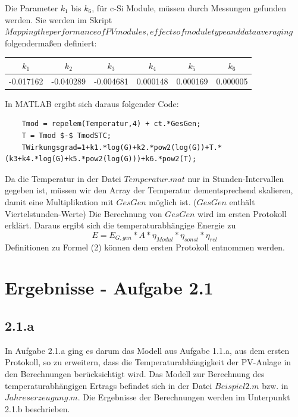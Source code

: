 \documentclass[a4paper,12pt]{article}
\begin{document}
	Die Parameter $k_1$ bis $k_6$, für c-Si Module, müssen durch Messungen gefunden werden. Sie werden im Skript $Mapping the performance of PV modules, effects of module type and data averaging$ folgendermaßen definiert:
	\begin{table}[H]
		\begin{tabular}{|l|c|c|c|c|c|}
			\hline
			\multicolumn{1}{|c|}{$k_1$} & $k_2$     & $k_3$     & $k_4$    & $k_5$    & $k_6$    \\ \hline
			-0.017162                   & -0.040289 & -0.004681 & 0.000148 & 0.000169 & 0.000005 \\ \hline
		\end{tabular}
	\end{table}
	In MATLAB ergibt sich daraus folgender Code:
	\begin{lstlisting}
	Tmod = repelem(Temperatur,4) + ct.*GesGen;
	T = Tmod $-$ TmodSTC;
	TWirkungsgrad=1+k1.*log(G)+k2.*pow2(log(G))+T.*(k3+k4.*log(G)+k5.*pow2(log(G)))+k6.*pow2(T);
	\end{lstlisting}
	Da die Temperatur in der Datei $Temperatur.mat$ nur in Stunden-Intervallen gegeben ist, müssen wir den Array der Temperatur dementsprechend skalieren, damit eine Multiplikation mit $GesGen$ möglich ist. ($GesGen$ enthält Viertelstunden-Werte)\newline
	Die Berechnung von $GesGen$ wird im ersten Protokoll erklärt.\newline
	Daraus ergibt sich die temperaturabhängige Energie zu
	\begin{equation}
	E=E_{G,gen}*A*\eta_{Modul}*\eta_{sonst}*\eta_{rel}
	\end{equation}
	Definitionen zu Formel (2) können dem ersten Protokoll entnommen werden.
	\newpage	
	\section{Ergebnisse - Aufgabe 2.1}
	\subsection{2.1.a}
	In Aufgabe 2.1.a ging es darum das Modell aus Aufgabe 1.1.a, aus dem ersten Protokoll, so zu erweitern, dass die Temperaturabhängigkeit der PV-Anlage in den Berechnungen berücksichtigt wird.\newline
	Das Modell zur Berechnung des temperaturabhängigen Ertrags befindet sich in der Datei $Beispiel2.m$ bzw. in $Jahreserzeugung.m$. Die Ergebnisse der Berechnungen werden im Unterpunkt 2.1.b beschrieben. 
\end{document}
